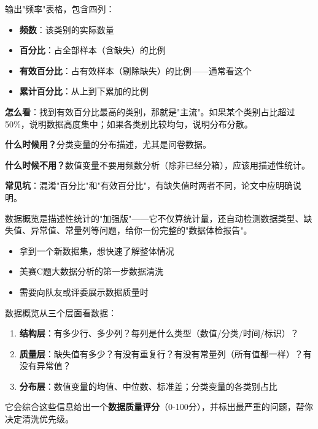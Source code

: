 \begin{algoresult}
输出"频率"表格，包含四列：
\begin{itemize}
    \item \textbf{频数}：该类别的实际数量
    \item \textbf{百分比}：占全部样本（含缺失）的比例
    \item \textbf{有效百分比}：占有效样本（剔除缺失）的比例——通常看这个
    \item \textbf{累计百分比}：从上到下累加的比例
\end{itemize}

\textbf{怎么看}：找到有效百分比最高的类别，那就是"主流"。如果某个类别占比超过50\%，说明数据高度集中；如果各类别比较均匀，说明分布分散。
\end{algoresult}

\begin{algonotes}
\textbf{什么时候用？}分类变量的分布描述，尤其是问卷数据。

\textbf{什么时候不用？}数值变量不要用频数分析（除非已经分箱），应该用描述性统计。

\textbf{常见坑}：混淆"百分比"和"有效百分比"，有缺失值时两者不同，论文中应明确说明。
\end{algonotes}


\begin{algointro}
数据概览是描述性统计的"加强版"——它不仅算统计量，还自动检测数据类型、缺失值、异常值、常量列等问题，给你一份完整的"数据体检报告"。
\end{algointro}

\begin{algoscene}
\begin{itemize}
    \item 拿到一个新数据集，想快速了解整体情况
    \item 美赛C题大数据分析的第一步数据清洗
    \item 需要向队友或评委展示数据质量时
\end{itemize}
\end{algoscene}

\begin{algoprinciple}
数据概览从三个层面看数据：
\begin{enumerate}
    \item \textbf{结构层}：有多少行、多少列？每列是什么类型（数值/分类/时间/标识）？
    \item \textbf{质量层}：缺失值有多少？有没有重复行？有没有常量列（所有值都一样）？有没有异常值？
    \item \textbf{分布层}：数值变量的均值、中位数、标准差；分类变量的各类别占比
\end{enumerate}

它会综合这些信息给出一个\textbf{数据质量评分}（0-100分），并标出最严重的问题，帮你决定清洗优先级。
\end{algoprinciple}

